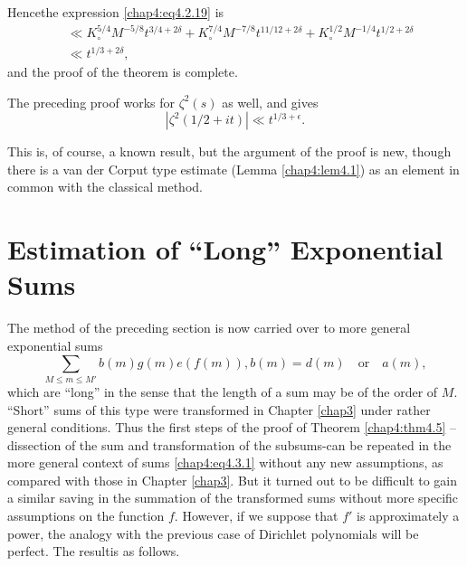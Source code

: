 Hence\pageoriginale the expression \eqref{chap4:eq4.2.19} is
\begin{align*}
& \ll K_\circ^{5/4}M^{-5/8}t^{3/4+2\delta}+K_\circ^{7/4}M^{-7/8}t^{11/12+2\delta}+ K_\circ^{1/2}M^{-1/4}t^{1/2+2\delta}\\
& \ll t^{1/3+2\delta},
\end{align*}
and the proof of the theorem is complete.
\begin{remark*}
The preceding proof works for $\zeta^2(s)$ as well, and gives
$$
\left|\zeta^2(1/2+it)\right|\ll t^{1/3+\epsilon}.
$$
\end{remark*}

This is, of course, a known result, but the argument of the proof is
new, though there is a van der Corput type estimate (Lemma
\ref{chap4:lem4.1}) as an element in common with the classical
method. 

\section{Estimation of ``Long'' Exponential Sums}\label{chap4:sec4.3} 

The method of the preceding section is now carried over to more
general exponential sums 
\begin{equation}\label{chap4:eq4.3.1}
\sum\limits_{M\leq m\leq M'}b(m)g(m)e(f(m)), b(m)=d(m)\quad\text{or}\quad a(m),
\end{equation}
which are ``long'' in the sense that the length of a sum may be of the order of $M$. ``Short'' sums of this type were transformed in Chapter \ref{chap3} under rather general conditions. Thus the first steps of the proof of Theorem \ref{chap4:thm4.5} --dissection of the sum and transformation of the subsums-can be repeated in the more general context of sums \eqref{chap4:eq4.3.1} without any new assumptions, as compared with those in Chapter \ref{chap3}. But it turned out to be difficult to gain a similar saving in the summation of the transformed sums without more specific assumptions on the function $f$. However, if we suppose that $f'$ is approximately a power, the analogy with the previous case of Dirichlet polynomials will be perfect. The result\pageoriginale is as follows.

